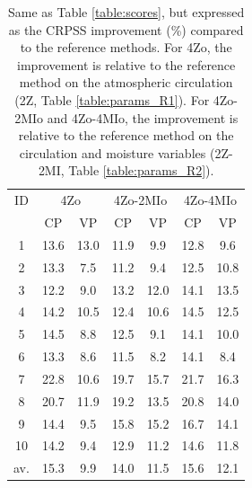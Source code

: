 \documentclass[5p]{elsarticle}
\begin{document}
\begin{table}[htb]
	\caption{Same as Table \ref{table:scores}, but expressed as the CRPSS improvement (\%) compared to the reference methods. For 4Zo, the improvement is relative to the reference method on the atmospheric circulation (2Z, Table \ref{table:params_R1}). For 4Zo-2MIo and 4Zo-4MIo, the improvement is relative to the reference method on the circulation and moisture variables (2Z-2MI, Table \ref{table:params_R2}).}
	\footnotesize
	\begin{center}
		\begin{tabular}{ccccccc}
			\hline 
			ID & \multicolumn{2}{c}{4Zo} & \multicolumn{2}{c}{4Zo-2MIo} & \multicolumn{2}{c}{4Zo-4MIo} \\ 
			& CP & VP & CP & VP & CP & VP \\ 
			\hline 
			1 & 13.6 & 13.0 & 11.9 & 9.9 & 12.8 & 9.6 \\
			2 & 13.3 & 7.5 & 11.2 & 9.4 & 12.5 & 10.8 \\
			3 & 12.2 & 9.0 & 13.2 & 12.0 & 14.1 & 13.5 \\
			4 & 14.2 & 10.5 & 12.4 & 10.6 & 14.5 & 12.5 \\
			5 & 14.5 & 8.8 & 12.5 & 9.1 & 14.1 & 10.0 \\
			6 & 13.3 & 8.6 & 11.5 & 8.2 & 14.1 & 8.4 \\
			7 & 22.8 & 10.6 & 19.7 & 15.7 & 21.7 & 16.3 \\
			8 & 20.7 & 11.9 & 19.2 & 13.5 & 20.8 & 14.0 \\
			9 & 14.4 & 9.5 & 15.8 & 15.2 & 16.7 & 14.1 \\
			10 & 14.2 & 9.4 & 12.9 & 11.2 & 14.6 & 11.8 \\
			\hline
			av. & 15.3 & 9.9 & 14.0 & 11.5 & 15.6 & 12.1 \\ 
			\hline 
		\end{tabular} 
	\end{center}
	\label{table:scores_diff}
\end{table}
\end{document}

